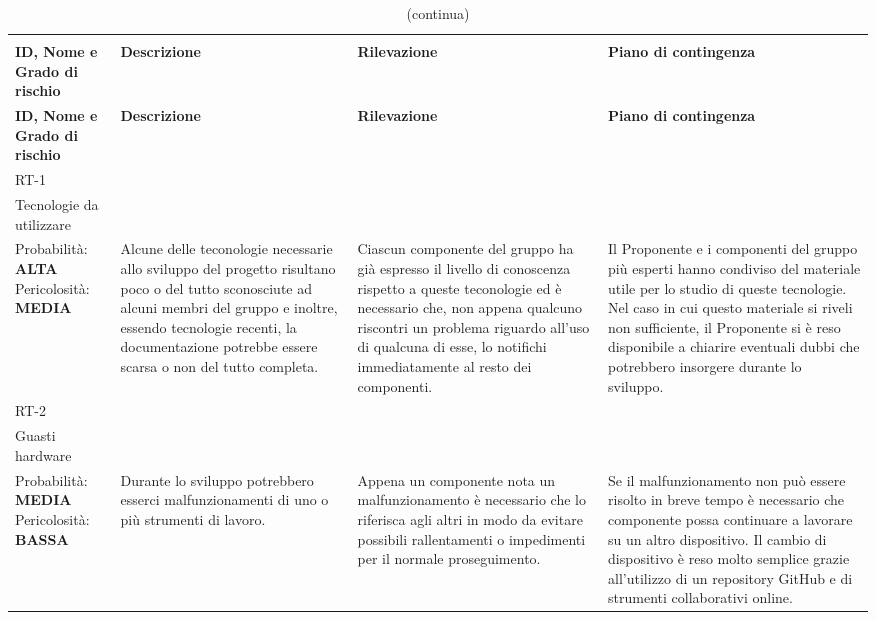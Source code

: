 \begin{longtable}{
		>{\centering}p{}
		>{\centering}p{}
		>{\centering}p{}
		>{\centering\arraybackslash}p{} }

	\rowcolor{white}\caption{Analisi dei  del progetto} \\
	\textbf{\color{white}ID, Nome e Grado di rischio} &
	\textbf{\color{white}Descrizione} &
	\textbf{\color{white}Rilevazione} &
	\textbf{\color{white}Piano di contingenza}
	\endfirsthead

	\rowcolor{white}\caption[]{(continua)}\\
	\textbf{\color{white}ID, Nome e Grado di rischio} &
	\textbf{\color{white}Descrizione} &
	\textbf{\color{white}Rilevazione} &
	\textbf{\color{white}Piano di contingenza}
	\endhead

	\hline \multicolumn{4}{c}{\textit{Continua nella prossima pagina}} \\
	\endfoot
	\hline
	\endlastfoot


	\rowcolor{lightRowColor}
	RT-1 \\ Tecnologie da utilizzare \\
		\vspace{5mm} %
	 	Probabilità: \textbf{ALTA} Pericolosità: \textbf{MEDIA}
		&
		Alcune delle teconologie necessarie allo sviluppo del progetto risultano poco o del tutto sconosciute ad alcuni membri del gruppo e inoltre, essendo tecnologie recenti, la documentazione potrebbe essere scarsa o non del tutto completa.
		&
		Ciascun componente del gruppo ha già espresso il livello di conoscenza rispetto a queste teconologie ed è necessario che, non appena qualcuno riscontri un problema riguardo all'uso di qualcuna di esse, lo notifichi immediatamente al resto dei componenti.
		&
		Il Proponente e i componenti del gruppo più esperti hanno condiviso del materiale utile per lo studio di queste tecnologie. Nel caso in cui questo materiale si riveli non sufficiente, il Proponente si è reso disponibile a chiarire eventuali dubbi che potrebbero insorgere durante lo sviluppo. \\

	\rowcolor{darkRowColor}
	RT-2 \\ Guasti hardware \\
		\vspace{5mm} %
		Probabilità: \textbf{MEDIA} Pericolosità: \textbf{BASSA}
		&
		Durante lo sviluppo potrebbero esserci malfunzionamenti di uno o più strumenti di lavoro.
		&
		Appena un componente nota un malfunzionamento è necessario che lo riferisca agli altri in modo da evitare possibili rallentamenti o impedimenti per il normale proseguimento.
		&
		Se il malfunzionamento non può essere risolto in breve tempo è necessario che componente possa continuare a lavorare su un altro dispositivo. Il cambio di dispositivo è reso molto semplice grazie all'utilizzo di un repository GitHub e di strumenti collaborativi online. \\


\end{longtable}
